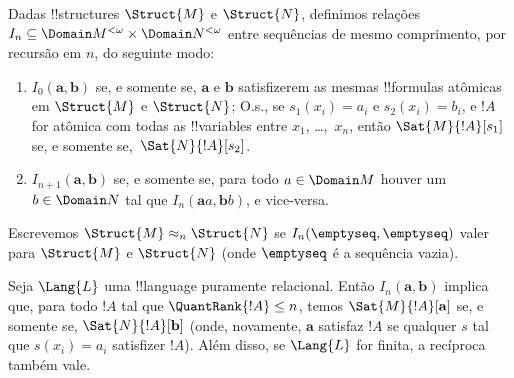 \documentclass[../../../include/open-logic-section]{subfiles}
\begin{document}
\begin{defn}
  Dadas !!{structure}s $\Struct{M}$ e $\Struct{N}$, definimos
  relações $I_n \subseteq \Domain M^{<\omega} \times \Domain N^{<\omega}$ entre
  sequências de mesmo comprimento, por recursão em $n$, do seguinte modo:
   \begin{enumerate}
   \item $I_0(\mathbf{a},\mathbf{b})$ se, e somente se, $\mathbf{a}$ e
     $\mathbf{b}$ satisfizerem as mesmas !!{formula}s atômicas em $\Struct{M}$
     e $\Struct{N}$; O.s.\@, se $s_1(x_i) = a_i$ e $s_2(x_i) =
     b_i$, e $!A$ for atômica com todas as !!{variable}s entre
     $x_1$, \dots,~$x_n$, então $\Sat{M}{!A}[s_1]$ se,
     e somente se,~$\Sat{N}{!A}[s_2]$.
   \item $I_{n+1} (\mathbf{a},\mathbf{b})$ se, e somente se, para todo
     $a\in \Domain M$ houver um $b\in \Domain N$ tal que $I_n
     (\mathbf{a}a,\mathbf{b}b)$, e vice-versa.
   \end{enumerate}
\end{defn}


\begin{defn}
  Escrevemos $\Struct{M} \approx_n \Struct{N}$ se
  $I_n(\emptyseq,\emptyseq)$ valer para $\Struct{M}$ e
  $\Struct{N}$ (onde $\emptyseq$ é a sequência vazia).
\end{defn}

\begin{thm}
  Seja $\Lang{L}$ uma !!{language} puramente relacional. Então $I_n
  (\mathbf{a},\mathbf{b})$ implica que, para todo $!A$ tal que
  $\QuantRank{!A} \le n$, temos $\Sat{M}{!A}[\mathbf{a}]$ se, e
  somente se, $\Sat{N}{!A}[\mathbf{b}]$ (onde, novamente, $\mathbf{a}$
  satisfaz $!A$ se qualquer $s$ tal que $s(x_i) = a_i$ satisfizer
  $!A$). Além disso, se $\Lang{L}$ for finita, a recíproca também vale.
\end{thm}
\end{document}
